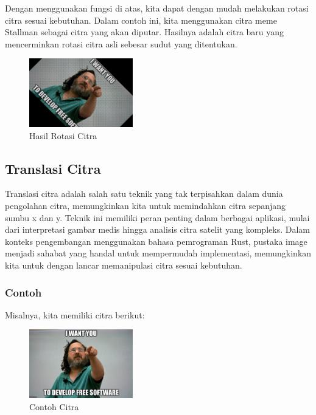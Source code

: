 \documentclass[a4paper,12pt,openany]{book}
\begin{document}
Dengan menggunakan fungsi di atas, kita dapat dengan mudah melakukan rotasi citra sesuai kebutuhan. Dalam contoh ini, kita menggunakan citra meme Stallman sebagai citra yang akan diputar. Hasilnya adalah citra baru yang mencerminkan rotasi citra asli sebesar sudut yang ditentukan.


\begin{figure}[H]
    \centering
    \includegraphics[width=0.4\textwidth]{./image/geometry/stallman-meme-rotated.jpg}
    \caption{Hasil Rotasi Citra}
\end{figure}


\subsection{Translasi Citra}
Translasi citra adalah salah satu teknik yang tak terpisahkan dalam dunia pengolahan citra, memungkinkan kita untuk memindahkan citra sepanjang sumbu x dan y. Teknik ini memiliki peran penting dalam berbagai aplikasi, mulai dari interpretasi gambar medis hingga analisis citra satelit yang kompleks. Dalam konteks pengembangan menggunakan bahasa pemrograman Rust, pustaka image menjadi sahabat yang handal untuk mempermudah implementasi, memungkinkan kita untuk dengan lancar memanipulasi citra sesuai kebutuhan.


\subsubsection{Contoh}
Misalnya, kita memiliki citra berikut:

\begin{figure}[H]
    \centering
    \includegraphics[width=0.4\textwidth]{./image/geometry/stallman-meme.jpg}
    \caption{Contoh Citra}
\end{figure}
\end{document}
